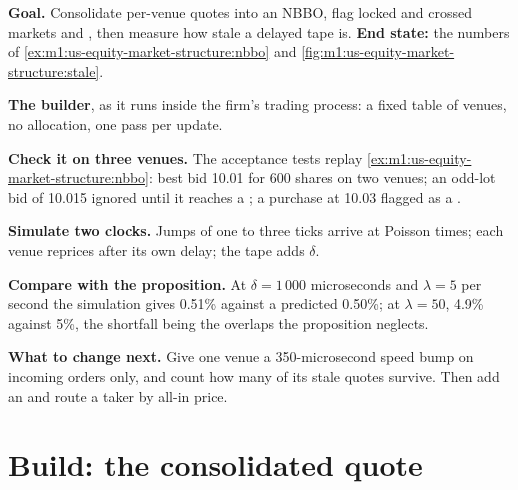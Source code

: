 \begin{tutorial}
\textbf{Goal.} Consolidate per-venue quotes into an NBBO, flag locked and
crossed markets and , then measure how stale a delayed tape is.
\textbf{End state:} the numbers of
\cref{ex:m1:us-equity-market-structure:nbbo} and
\cref{fig:m1:us-equity-market-structure:stale}.
\begin{tutsteps}
\item \textbf{The builder}, as it runs inside the firm's trading process: a
fixed table of venues, no allocation, one pass per update.
\label{lst:m1:us-equity-market-structure:cpp}
\item \textbf{Check it on three venues.} The acceptance tests replay
\cref{ex:m1:us-equity-market-structure:nbbo}: best bid 10.01 for 600 shares
on two venues; an odd-lot bid of 10.015 ignored until it reaches a ;
a purchase at 10.03 flagged as a .
\item \textbf{Simulate two clocks.} Jumps of one to three ticks arrive at
Poisson times; each venue reprices after its own delay; the tape adds
$\delta$.
\label{lst:m1:us-equity-market-structure:stale}
\item \textbf{Compare with the proposition.} At $\delta = 1\,000$
microseconds and $\lambda = 5$ per second the simulation gives 0.51\%
against a predicted 0.50\%; at $\lambda = 50$, 4.9\% against 5\%, the
shortfall being the overlaps the proposition neglects.
\end{tutsteps}
\textbf{What to change next.} Give one venue a 350-microsecond speed bump on
incoming orders only, and count how many of its stale quotes survive. Then
add an  and route a taker by all-in price.
\end{tutorial}

\section{Build: the consolidated quote}\label{bld:m1:us-equity-market-structure:nbbo}

